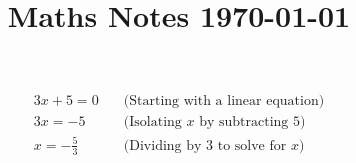 \documentclass{article}
\title{Maths Notes \today}
\begin{document}
\maketitle
\begin{align}
	3x + 5 = 0 \quad &\text{(Starting with a linear equation)} \\ 
	3x = -5 \quad &\text{(Isolating } x \text{ by subtracting 5)} \\ 
	x = -\frac{5}{3} \quad &\text{(Dividing by 3 to solve for } x\text{)}
\end{align}
\end{document}
